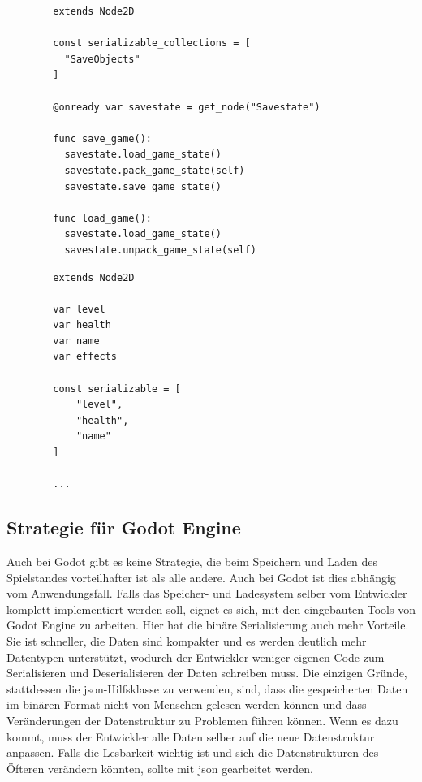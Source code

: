 \begin{listing}[htp]
    \begin{verbatim}
        extends Node2D

        const serializable_collections = [
          "SaveObjects"
        ]

        @onready var savestate = get_node("Savestate")

        func save_game():
          savestate.load_game_state()
          savestate.pack_game_state(self)  
          savestate.save_game_state()

        func load_game():
          savestate.load_game_state()
          savestate.unpack_game_state(self)
    \end{verbatim}
    \caption{Speichern und Laden des "SaveObjects"-Knoten mit Thoth \cite{stupidratstudioGodotSaveLoad}}
    \label{lst:godotThoth}
\end{listing} 

\begin{listing}[htp]
    \begin{verbatim}
        extends Node2D

        var level
        var health
        var name
        var effects

        const serializable = [
            "level",
            "health",
            "name"
        ]

        ...
    \end{verbatim}
    \caption{Thoth-Einstellung, welche Variablen einer Klasse serialisiert werden sollen \cite{stupidratstudioGodotSaveLoad}}
    \label{lst:godotThothObject}
\end{listing} 



\subsection{Strategie für Godot Engine}
Auch bei Godot gibt es keine Strategie, die beim Speichern und Laden des Spielstandes vorteilhafter ist als alle andere. Auch bei Godot ist dies abhängig vom Anwendungsfall. Falls das Speicher- und Ladesystem selber vom Entwickler komplett implementiert werden soll, eignet es sich, mit den eingebauten Tools von Godot Engine zu arbeiten. Hier hat die binäre Serialisierung auch mehr Vorteile. Sie ist schneller, die Daten sind kompakter und es werden deutlich mehr Datentypen unterstützt, wodurch der Entwickler weniger eigenen Code zum Serialisieren und Deserialisieren der Daten schreiben muss. Die einzigen Gründe, stattdessen die \ac{json}-Hilfsklasse zu verwenden, sind, dass die gespeicherten Daten im binären Format nicht von Menschen gelesen werden können und dass Veränderungen der Datenstruktur zu Problemen führen können. Wenn es dazu kommt, muss der Entwickler alle Daten selber auf die neue Datenstruktur anpassen. Falls die Lesbarkeit wichtig ist und sich die Datenstrukturen des Öfteren verändern könnten, sollte mit \ac{json} gearbeitet werden.

